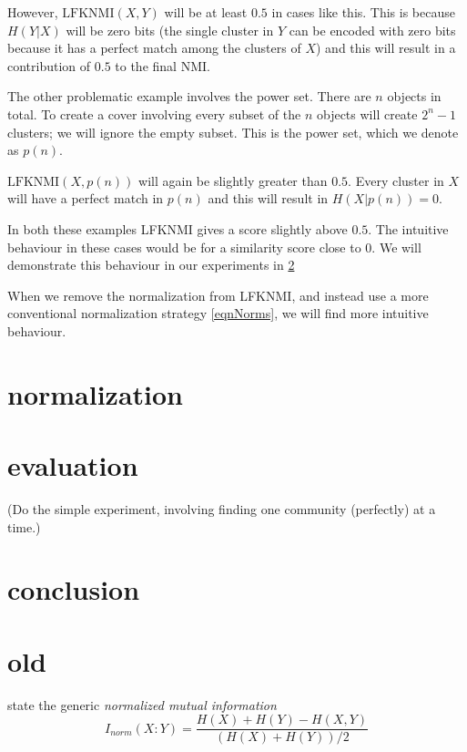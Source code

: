 \documentclass[9pt,technote]{IEEEtran}
\begin{document}
However, $\mbox{LFKNMI}(X,Y)$ will be at least $0.5$ in cases like this.
This is because $H(Y|X)$ will be zero bits
(the single cluster in $Y$ can be encoded with zero bits because it has a perfect match among the clusters of $X$)
and this will result in a contribution of $0.5$ to the final NMI.

The other problematic example involves the power set. There are $n$ objects in total. To create a cover involving
every subset of the $n$ objects will create $2^n - 1$ clusters; we will ignore the empty subset.
This is the power set, which we denote as $p(n)$.

$\mbox{LFKNMI}(X, p(n))$ will again be slightly greater than $0.5$. Every cluster in $X$ will
have a perfect match in $p(n)$ and this will result in $H(X|p(n)) = 0$.

In both these examples LFKNMI gives a score slightly above $0.5$. The intuitive behaviour
in these cases would be for a similarity score close to $0$.
We will demonstrate this behaviour in our experiments in \cref{secEval}

When we remove the
normalization from LFKNMI, and instead use a more conventional normalization strategy
\cref{eqnNorms}, we will find more intuitive behaviour.

\section{normalization}

\section{evaluation}
\label{secEval}

(Do the simple experiment, involving finding one community (perfectly) at a time.)

\section{conclusion}







\break

\section{old}

 \citet{lancichinetti-2009} state the generic \emph{normalized mutual information}
 \begin{equation}
	 I_{norm}(X:Y) = \frac { H(X) + H(Y) - H(X,Y) } { \left( H(X) + H(Y) \right ) /2 }   \label{NMI}
 \end{equation}
\end{document}
